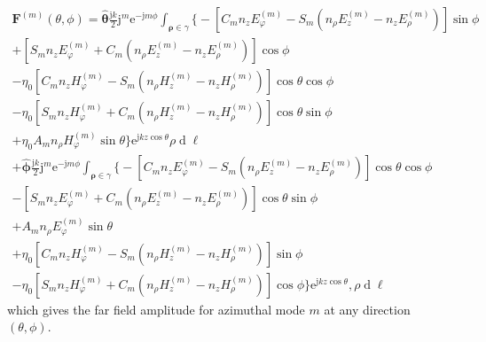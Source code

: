 \documentclass[a4paper,12pt]{article}
\renewcommand{\vec}[1]{\boldsymbol{#1}}
\newcommand{\unitvec}[1]{\hat{\vec{#1}}}
\newcommand{\mrm}[1]{\mathrm{#1}}
\newcommand{\diff}{\operatorname{d}\!}
\newcommand{\ju}{\mrm{j}}
\newcommand{\eu}{\mrm{e}}
\newcommand{\Fv}{\vec{F}}
\newcommand{\thetauv}{\unitvec{\theta}}
\newcommand{\phiuv}{\unitvec{\phi}}
\begin{document}
\begin{multline}
  \Fv^{(m)}(\theta,\phi) = \thetauv\frac{\ju k}{2}\ju^{m}\eu^{-\ju
    m\phi} \int_{\vec{\rho}\in\gamma} \Big\{ - \left[ C_{m}
    n_{z}E_{\varphi}^{(m)}
    - S_{m} (n_{\rho}E_{z}^{(m)} - n_{z}E_{\rho}^{(m)}) \right] \sin\phi \\
  + \left[ S_{m} n_{z}E_{\varphi}^{(m)}
    + C_{m} (n_{\rho}E_{z}^{(m)} - n_{z}E_{\rho}^{(m)}) \right] \cos\phi \\
  - \eta_{0} \left[ C_{m} n_{z}H_{\varphi}^{(m)}
    - S_{m} (n_{\rho}H_{z}^{(m)} - n_{z}H_{\rho}^{(m)}) \right] \cos\theta\cos\phi \\
  - \eta_{0}\left[ S_{m} n_{z}H_{\varphi}^{(m)}
    + C_{m} (n_{\rho}H_{z}^{(m)} - n_{z}H_{\rho}^{(m)}) \right] \cos\theta\sin\phi \\
  + \eta_{0} A_{m} n_{\rho}H_{\varphi}^{(m)}
  \sin\theta \Big\} \eu^{\ju kz\cos\theta} \rho\diff\ell \\
  + \phiuv \frac{\ju k}{2} \ju^{m}\eu^{-\ju
    m\phi}\int_{\vec{\rho}\in\gamma} \Big\{ - \left[ C_{m}
    n_{z}E_{\varphi}^{(m)}
    - S_{m} (n_{\rho}E_{z}^{(m)} - n_{z}E_{\rho}^{(m)}) \right] \cos\theta\cos\phi \\
  - \left[ S_{m} n_{z}E_{\varphi}^{(m)}
    + C_{m} (n_{\rho}E_{z}^{(m)} - n_{z}E_{\rho}^{(m)}) \right] \cos\theta\sin\phi \\
  + A_{m} n_{\rho}E_{\varphi}^{(m)} \sin\theta \\
  + \eta_{0} \left[ C_{m} n_{z}H_{\varphi}^{(m)}
    - S_{m} (n_{\rho}H_{z}^{(m)} - n_{z}H_{\rho}^{(m)}) \right] \sin\phi \\
  - \eta_{0}\left[ S_{m} n_{z}H_{\varphi}^{(m)} +
    C_{m} (n_{\rho}H_{z}^{(m)} -
    n_{z}H_{\rho}^{(m)}) \right] \cos\phi \Big\} \eu^{\ju kz\cos\theta},
  \rho\diff\ell \label{eq:arbitraryfull}
\end{multline}
which gives the far field amplitude for azimuthal mode $m$ at any
direction $(\theta,\phi)$.





\end{document}
